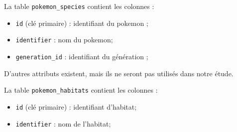 La table \texttt{pokemon\_species} contient les colonnes :

\begin{itemize}[itemsep=0mm]
	\item \texttt{id} (clé primaire) : identifiant du pokemon ;
	\item \texttt{identifier} : nom du pokemon;
	\item \texttt{generation\_id} : identifiant du génération ;
\end{itemize}
D'autres attributs existent, mais ils ne seront pas utilisés dans notre étude. 

La table \texttt{pokemon\_habitats} contient les colonnes :

\begin{itemize}[itemsep=0mm]
	\item \texttt{id} (clé primaire) : identifiant d'habitat;
	\item \texttt{identifier} : nom de l'habitat;
\end{itemize}

